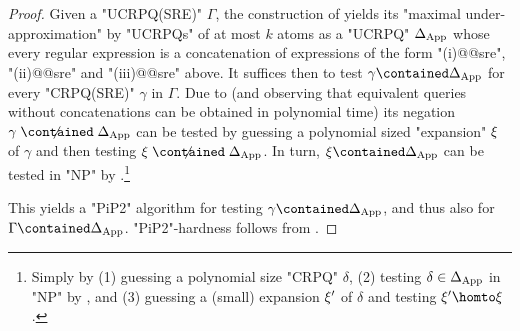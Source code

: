 \begin{proof}
	Given a "UCRPQ(SRE)" $\Gamma$, the construction of  yields its "maximal under-approximation" by "UCRPQs" of at most $k$ atoms as a "UCRPQ" $\Delta_{\textnormal{App}}$ whose every regular expression is a concatenation of expressions of the form "(i)@@sre", "(ii)@@sre" and "(iii)@@sre" above.
	It suffices then to test $\gamma \contained \Delta_{\textnormal{App}}$ for every "CRPQ(SRE)" $\gamma$ in $\Gamma$. Due to 
	(and observing that equivalent queries without concatenations can be obtained in polynomial time)
	its negation $\gamma \centernot{\contained} \Delta_{\textnormal{App}}$ can be tested by guessing a polynomial sized "expansion" $\xi$ of $\gamma$ and then testing $\anexpansion \centernot{\contained} \Delta_{\textnormal{App}}$.
	In turn, $\anexpansion \contained \Delta_{\textnormal{App}}$ can be tested in "NP" by 
	\cite[Theorem 4.2]{FigueiraEtal2020Containment}.\footnote{Simply by (1) guessing a polynomial size "CRPQ" $\delta$, (2) testing $\delta \in \Delta_{\textnormal{App}}$ in "NP" by , and (3) guessing a (small) expansion $\xi'$ of $\delta$ and testing $\anexpansion' \homto \anexpansion$.}

	This yields a "PiP2" algorithm for testing $\gamma \contained \Delta_{\textnormal{App}}$, and thus also for $\Gamma \contained \Delta_{\textnormal{App}}$.
	"PiP2"-hardness follows from .
\end{proof}

